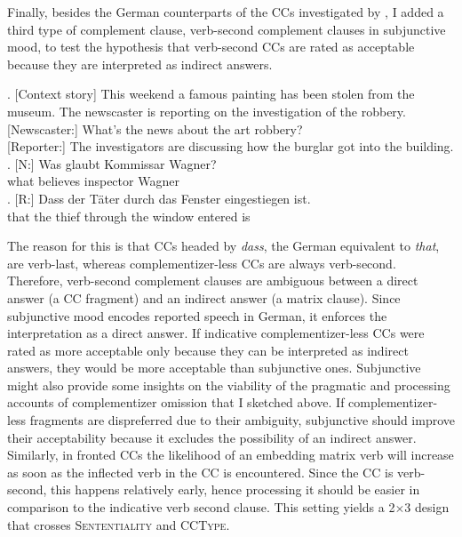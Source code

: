 Finally, besides the German counterparts of the CCs investigated by \citet{merchant.etal2013}, I added a third type of complement clause, verb-second complement clauses in subjunctive mood, to test the hypothesis that verb-second CCs are rated as acceptable because they are interpreted as indirect answers.

\ex. [Context story] This weekend a famous painting has been stolen from the museum. The newscaster is reporting on the investigation of the robbery.\\ \mbox{}[Newscaster:] What's the news about the art robbery?\\ \mbox{}[Reporter:] The investigators are discussing how the burglar got into the building.\label{ex:ccs-experiment-sample-item}
\ag. [N:] Was glaubt Kommissar Wagner?\\
\mbox{} what believes inspector Wagner\\
\bg. [R:] Dass der Täter durch  das Fenster  eingestiegen ist.\\
     \mbox{} that  the thief through the window  entered is\\

The reason for this is that CCs headed by \textit{dass}, the German equivalent to \textit{that}, are verb-last, whereas complementizer-less CCs are always verb-second. Therefore, verb-second complement clauses are ambiguous between a direct answer (a CC fragment) and an indirect answer (a matrix clause). Since subjunctive mood encodes reported speech in German, it enforces the interpretation as a direct answer. If indicative complementizer-less CCs were rated as more acceptable only because they can be interpreted as indirect answers, they would be more acceptable than subjunctive ones. Subjunctive might also provide some insights on the viability of the pragmatic and processing accounts of complementizer omission that I sketched above. If complementizer-less fragments are dispreferred due to their ambiguity, subjunctive should improve their acceptability because it excludes the possibility of an indirect answer. Similarly, in fronted CCs the likelihood of an embedding matrix verb will increase as soon as the inflected verb in the CC is encountered. Since the CC is verb-second, this happens relatively early, hence processing it should be easier in comparison to the indicative verb second clause. This setting yields a 2$\times$3 design that crosses \textsc{Sententiality} and \textsc{CCType}.

